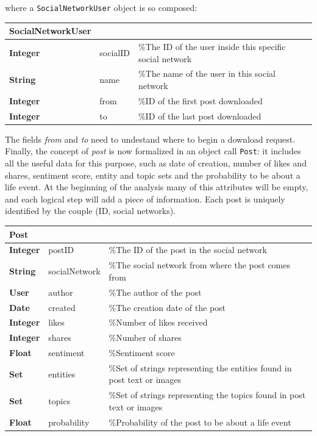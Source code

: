 where a \texttt{SocialNetworkUser} object is so composed:

\begin{center}
\label{tab:social}
\begin{tabular}{lll}
\hline
SocialNetworkUser & & \\
\hline
\textbf{Integer} & socialID & \%The ID of the user inside this specific social network \\
\textbf{String} & name & \%The name of the user in this social network \\
\textbf{Integer} & from & \%ID of the first post downloaded \\
\textbf{Integer} & to & \%ID of the last post downloaded \\
\hline
\end{tabular}
\end{center}

The fields \textit{from} and \textit{to} need to undestand where to begin a download request. Finally, the concept of \textit{post} is now formalized in an object call \texttt{Post}: it includes all the useful data for this purpose, such as date of creation, number of likes and shares, sentiment score, entity and topic sets and the probability to be about a life event. At the beginning of the analysis many of this attributes will be empty, and each logical step will add a piece of information. Each post is uniquely identified by the couple (ID, social networks).

\begin{center}
\label{tab:post}
\begin{tabular}{lll}
\hline
Post & & \\
\hline
\textbf{Integer} & postID & \%The ID of the post in the social network\\
\textbf{String} & socialNetwork & \%The social network from where the post comes from \\
\textbf{User} & author & \%The author of the post \\
\textbf{Date} & created & \%The creation date of the post \\
\textbf{Integer} & likes & \%Number of likes received \\
\textbf{Integer} & shares & \%Number of shares \\
\textbf{Float} & sentiment & \%Sentiment score \\
\textbf{Set} & entities & \%Set of strings representing the entities found in post text or images \\
\textbf{Set} & topics & \%Set of strings representing the topics found in post text or images \\
\textbf{Float} & probability & \%Probability of the post to be about a life event \\
\hline
\end{tabular}
\end{center}

